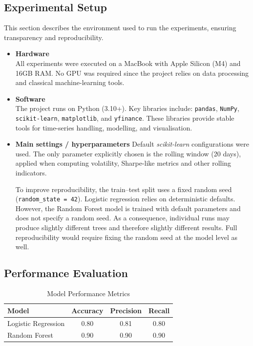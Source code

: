 \documentclass[11pt,a4paper]{article}
\begin{document}
\subsection{Experimental Setup}

\noindent This section describes the environment used to run the experiments, ensuring transparency and reproducibility.

\begin{itemize}

\item \textbf{Hardware} \\
All experiments were executed on a MacBook with Apple Silicon (M4) and 16GB RAM. No GPU was required since the project relies on data processing and classical machine-learning tools.

\item \textbf{Software} \\
The project runs on Python (3.10+). Key libraries include:
\texttt{pandas}, \texttt{NumPy}, \texttt{scikit-learn}, \texttt{matplotlib}, and \texttt{yfinance}. These libraries provide stable tools for time-series handling, modelling, and visualisation.

\item \textbf{Main settings / hyperparameters} Default \textit{scikit-learn} configurations were used. The only parameter explicitly chosen is the rolling window (20 days), applied when computing volatility, Sharpe-like metrics and other rolling indicators. 

To improve reproducibility, the train–test split uses a fixed random seed (\texttt{random\_state = 42}). Logistic regression relies on deterministic defaults. However, the Random Forest model is trained with default parameters and does not specify a random seed. As a consequence, individual runs may produce slightly different trees and therefore slightly different results. Full reproducibility would require fixing the random seed at the model level as well.

\end{itemize}

\subsection{Performance Evaluation}


\begin{table}[H]
\centering
\caption{Model Performance Metrics}
\label{tab:performance}
\begin{tabular}{|l|c|c|c|}
\hline
\textbf{Model} & \textbf{Accuracy} & \textbf{Precision} & \textbf{Recall} \\
\hline
Logistic Regression & 0.80 & 0.81 & 0.80 \\
Random Forest & 0.90 & 0.90 & 0.90 \\
\hline
\end{tabular}
\end{table}
\end{document}
